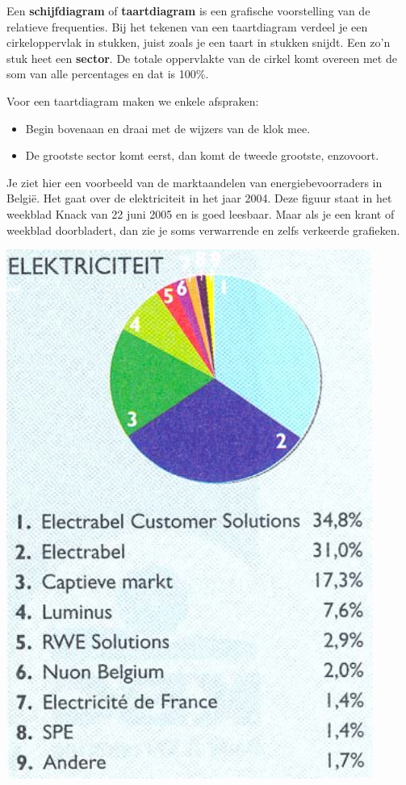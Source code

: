 \documentclass[12pt,twoside,a4paper]{article}
\begin{document}
\begin{minipage}{0.5\linewidth}
Een {\bf schijfdiagram} of {\bf taartdiagram} is een grafische voorstelling van de relatieve frequenties. Bij het tekenen van een taartdiagram verdeel je een cirkeloppervlak in stukken, juist zoals je een taart in stukken snijdt. Een zo'n stuk heet een {\bf sector}. De totale oppervlakte van de cirkel komt overeen met de som van alle percentages en dat is 100\%.

Voor een taartdiagram maken we enkele afspraken:
\begin{itemize}
  \item Begin bovenaan en draai met de wijzers van de klok mee.
  \item De grootste sector komt eerst, dan komt de tweede
grootste, enzovoort.
\end{itemize}

Je ziet hier een voorbeeld van de marktaandelen van energiebevoorraders in België. Het gaat over de elektriciteit in het jaar 2004. Deze figuur staat in het weekblad Knack van 22 juni 2005 en is goed leesbaar. Maar als je een krant of weekblad doorbladert, dan zie je soms verwarrende en zelfs verkeerde grafieken.
\end{minipage}
\begin{minipage}{0.5\linewidth}
\begin{center}
  \includegraphics[width=0.9\textwidth]{cirkeldiagram_electriciteit}
\end{center}
\end{minipage}
\end{document}
